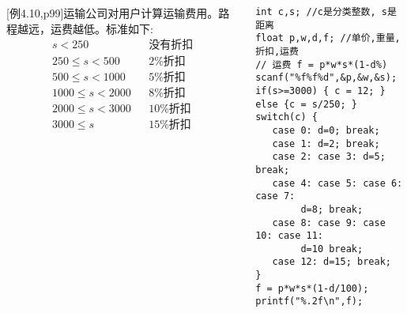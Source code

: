 \begin{frame}
\begin{columns}[T]
\small
[例4.10,p99]运输公司对用户计算运输费用。路程越远，运费越低。标准如下:  
\begin{align*}
s<250 &&\text{没有折扣}\\
250\le s < 500 &&\text{2\%折扣}\\
500\le s < 1000 &&\text{5\%折扣}\\
1000\le s < 2000 &&\text{8\%折扣}\\
2000\le s < 3000 &&\text{10\%折扣}\\
3000\le s  &&\text{15\%折扣}
\end{align*}
\vspace{-0.4cm}
\begin{lstlisting}
int c,s; //c是分类整数, s是距离
float p,w,d,f; //单价,重量,折扣,运费
// 运费 f = p*w*s*(1-d%) 
scanf("%f%f%d",&p,&w,&s);
if(s>=3000) { c = 12; } else {c = s/250; }
switch(c) {
   case 0: d=0; break;
   case 1: d=2; break;
   case 2: case 3: d=5; break;
   case 4: case 5: case 6: case 7: 
        d=8; break;
   case 8: case 9: case 10: case 11: 
        d=10 break;
   case 12: d=15; break;
}
f = p*w*s*(1-d/100);  printf("%.2f\n",f);
\end{lstlisting}
\end{columns}
\end{frame}
